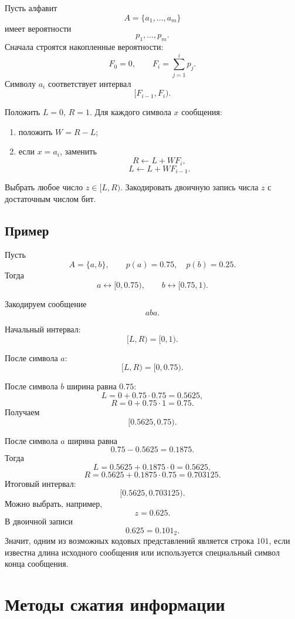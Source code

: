\documentclass[12pt,a4paper]{article}
\begin{document}
Пусть алфавит
\[
    A=\{a_1,\dots,a_m\}
\]
имеет вероятности
\[
    p_1,\dots,p_m.
\]
Сначала строятся накопленные вероятности:
\[
    F_0=0,\qquad
    F_i=\sum_{j=1}^{i}p_j.
\]
Символу $a_i$ соответствует интервал
\[
    [F_{i-1},F_i).
\]

\begin{algorithm}[H]
\caption{Арифметическое кодирование}
\begin{algorithmic}[1]
\STATE Положить $L=0$, $R=1$.
\STATE Для каждого символа $x$ сообщения:
\begin{enumerate}
    \item положить $W=R-L$;
    \item если $x=a_i$, заменить
    \[
        R \leftarrow L + W F_i,
    \]
    \[
        L \leftarrow L + W F_{i-1}.
    \]
\end{enumerate}
\STATE Выбрать любое число $z\in[L,R)$.
\STATE Закодировать двоичную запись числа $z$ с достаточным числом бит.
\end{algorithmic}
\end{algorithm}

\subsection{Пример}

Пусть
\[
    A=\{a,b\},\qquad p(a)=0.75,\quad p(b)=0.25.
\]
Тогда
\[
    a\leftrightarrow [0,0.75),\qquad
    b\leftrightarrow [0.75,1).
\]

Закодируем сообщение
\[
    aba.
\]

Начальный интервал:
\[
    [L,R)=[0,1).
\]

После символа $a$:
\[
    [L,R)=[0,0.75).
\]

После символа $b$ ширина равна $0.75$:
\[
    L=0+0.75\cdot 0.75=0.5625,
\]
\[
    R=0+0.75\cdot 1=0.75.
\]
Получаем
\[
    [0.5625,0.75).
\]

После символа $a$ ширина равна
\[
    0.75-0.5625=0.1875.
\]
Тогда
\[
    L=0.5625+0.1875\cdot 0=0.5625,
\]
\[
    R=0.5625+0.1875\cdot 0.75=0.703125.
\]
Итоговый интервал:
\[
    [0.5625,0.703125).
\]
Можно выбрать, например,
\[
    z=0.625.
\]
В двоичной записи
\[
    0.625=0.101_2.
\]
Значит, одним из возможных кодовых представлений является строка $101$, если известна длина исходного сообщения или используется специальный символ конца сообщения.

\section{Методы сжатия информации}
\end{document}
